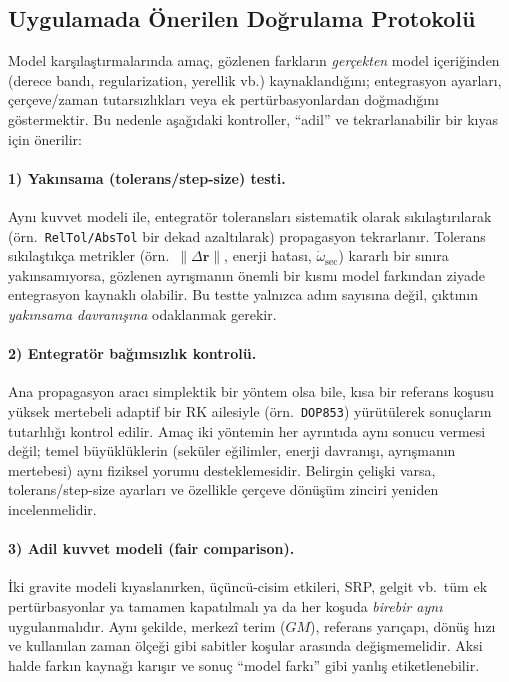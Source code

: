 \subsection{Uygulamada Önerilen Doğrulama Protokolü}
\label{subsec:validation_protocol}

Model karşılaştırmalarında amaç, gözlenen farkların \emph{gerçekten} model içeriğinden (derece bandı, regularization,
yerellik vb.) kaynaklandığını; entegrasyon ayarları, çerçeve/zaman tutarsızlıkları veya ek pertürbasyonlardan
doğmadığını göstermektir. Bu nedenle aşağıdaki kontroller, ``adil'' ve tekrarlanabilir bir kıyas için önerilir:

\paragraph{1) Yakınsama (tolerans/step-size) testi.}
Aynı kuvvet modeli ile, entegratör toleransları sistematik olarak sıkılaştırılarak (örn.\ \texttt{RelTol/AbsTol}
bir dekad azaltılarak) propagasyon tekrarlanır. Tolerans sıkılaştıkça metrikler (örn.\ $\|\Delta\mathbf r\|$,
enerji hatası, $\dot{\omega}_{\text{sec}}$) kararlı bir sınıra yakınsamıyorsa, gözlenen ayrışmanın önemli bir kısmı
model farkından ziyade entegrasyon kaynaklı olabilir. Bu testte yalnızca adım sayısına değil, çıktının \emph{yakınsama
davranışına} odaklanmak gerekir.

\paragraph{2) Entegratör bağımsızlık kontrolü.}
Ana propagasyon aracı simplektik bir yöntem olsa bile, kısa bir referans koşusu yüksek mertebeli adaptif bir RK ailesiyle
(örn.\ \texttt{DOP853}) yürütülerek sonuçların tutarlılığı kontrol edilir. Amaç iki yöntemin her ayrıntıda aynı sonucu
vermesi değil; temel büyüklüklerin (seküler eğilimler, enerji davranışı, ayrışmanın mertebesi) aynı fiziksel yorumu
desteklemesidir. Belirgin çelişki varsa, tolerans/step-size ayarları ve özellikle çerçeve dönüşüm zinciri yeniden incelenmelidir.

\paragraph{3) Adil kuvvet modeli (fair comparison).}
İki gravite modeli kıyaslanırken, üçüncü-cisim etkileri, SRP, gelgit vb.\ tüm ek pertürbasyonlar ya tamamen kapatılmalı
ya da her koşuda \emph{birebir aynı} uygulanmalıdır. Aynı şekilde, merkezî terim ($GM$), referans yarıçapı, dönüş hızı ve
kullanılan zaman ölçeği gibi sabitler koşular arasında değişmemelidir. Aksi halde farkın kaynağı karışır ve sonuç
``model farkı'' gibi yanlış etiketlenebilir.

